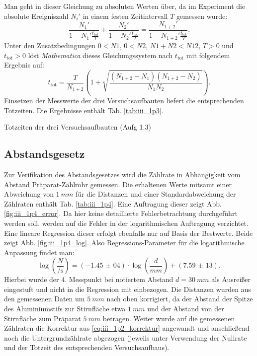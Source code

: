 Man geht in dieser Gleichung zu absoluten Werten über, da im Experiment die absolute Ereigniszahl $N_i'$ in einem festen Zeitintervall $T$ gemessen wurde:
\begin{equation}
\frac{N_1'}{1-N_1'\frac{t_\mathrm{tot}}{T}} + \frac{N_2'}{1-N_2'\frac{t_\mathrm{tot}}{T}} = \frac{N_{1+2}'}{1-N_{1+2}'\frac{t_\mathrm{tot}}{T}}.
\end{equation}
Unter den Zusatzbedingungen $0 < N1$, $0 < N2$, $N1 + N2 < N12$, $T > 0$ und $t_\mathrm{tot} > 0$ löst \textit{Mathematica} dieses Gleichungssystem nach $t_\mathrm{tot}$ mit folgendem Ergebnis auf:
\begin{equation}
t_\mathrm{tot} = \frac{T}{N_{1+2}}\left(1+\sqrt{\frac{(N_{1+2}-N_1)(N_{1+2}-N_2)}{N_1 N_2}}\right).
\end{equation}
Einsetzen der Messwerte der drei Versuchsaufbauten liefert die entsprechenden Totzeiten. Die Ergebnisse enthält Tab. \ref{tab:iii_1p3}.

\begin{table}[tb]
	\centering
	\caption{Totzeiten der drei Versuchsaufbauten (Aufg 1.3)}
	\label{tab:iii_1p3}
	
\end{table}

\subsection{Abstandsgesetz}
Zur Verifikation des Abstandsgesetzes wird die Zählrate in Abhängigkeit vom Abstand Präparat-Zählrohr gemessen. Die erhaltenen Werte mitsamt einer Abweichung von $\SI{1}{mm}$ für die Distanzen und einer Standardabweichung der Zählraten enthält Tab. \ref{tab:iii_1p4}. Eine Auftragung dieser zeigt Abb. \ref{fig:iii_1p4_error}. Da hier keine detaillierte Fehlerbetrachtung durchgeführt werden soll, werden auf die Fehler in der logarithmischen Auftragung verzichtet. Eine lineare Regression dieser erfolgt ebenfalls nur auf Basis der Bestwerte. Beide zeigt Abb. \ref{fig:iii_1p4_log}. Also Regressions-Parameter für die logarithmische Anpassung findet man:
\begin{equation}
\log\left(\frac{N}{\si{\per\second}}\right) = (\num{-1,45(04)}) \cdot \log\left(\frac{d}{\si{mm}}\right) + (\num{7,59(13)}).
\end{equation}
Hierbei wurde der 4. Messpunkt bei notiertem Abstand $d = \SI{30}{mm}$ als Ausreißer eingestuft und nicht in die Regression mit einbezogen. Die Distanzen wurden aus den gemessenen Daten um $\SI{5}{mm}$ nach oben korrigiert, da der Abstand der Spitze des Aluminiumstifs zur Stirnfläche etwa $\SI{1}{mm}$ und der Abstand von der Stirnfläche zum Präparat $\SI{5}{mm}$ betragen. Weiter wurde auf die gemessenen Zählraten die Korrektur aus \eqref{eq:iii_1p2_korrektur} angewandt und anschließend noch die Untergrundzählrate abgezogen (jeweils unter Verwendung der Nullrate und der Totzeit des entsprechenden Versuchsaufbaus).

